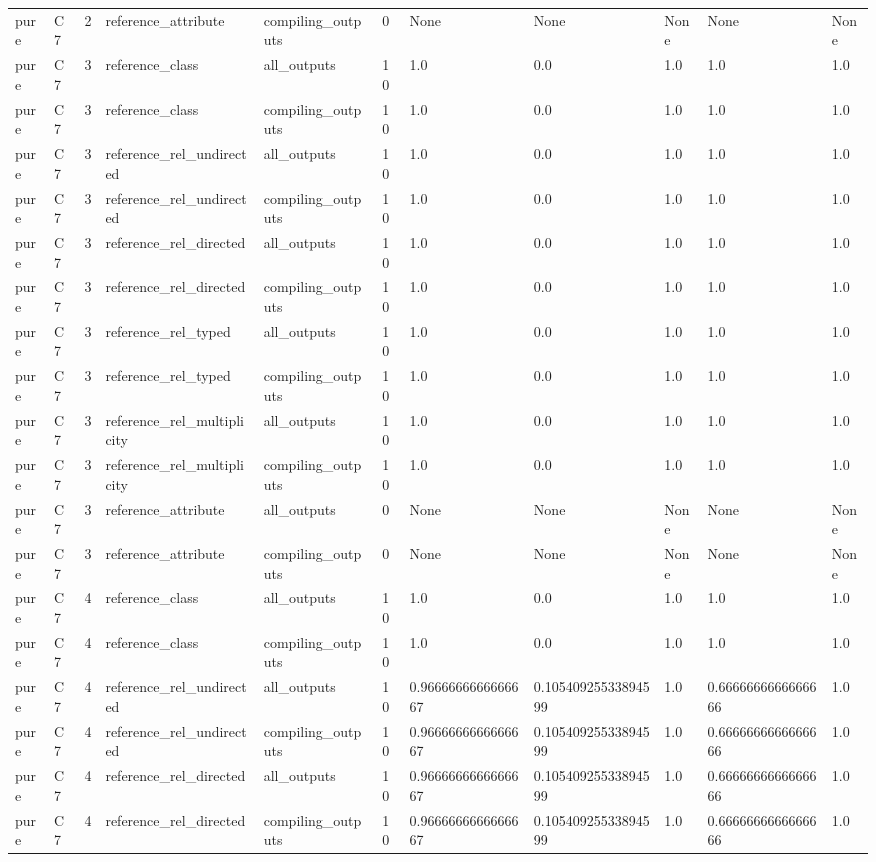 \begin{tabular}{lllllllllll}
pure & C7 & 2 & reference\_attribute & compiling\_outputs & 0 & None & None & None & None & None \\
pure & C7 & 3 & reference\_class & all\_outputs & 10 & 1.0 & 0.0 & 1.0 & 1.0 & 1.0 \\
pure & C7 & 3 & reference\_class & compiling\_outputs & 10 & 1.0 & 0.0 & 1.0 & 1.0 & 1.0 \\
pure & C7 & 3 & reference\_rel\_undirected & all\_outputs & 10 & 1.0 & 0.0 & 1.0 & 1.0 & 1.0 \\
pure & C7 & 3 & reference\_rel\_undirected & compiling\_outputs & 10 & 1.0 & 0.0 & 1.0 & 1.0 & 1.0 \\
pure & C7 & 3 & reference\_rel\_directed & all\_outputs & 10 & 1.0 & 0.0 & 1.0 & 1.0 & 1.0 \\
pure & C7 & 3 & reference\_rel\_directed & compiling\_outputs & 10 & 1.0 & 0.0 & 1.0 & 1.0 & 1.0 \\
pure & C7 & 3 & reference\_rel\_typed & all\_outputs & 10 & 1.0 & 0.0 & 1.0 & 1.0 & 1.0 \\
pure & C7 & 3 & reference\_rel\_typed & compiling\_outputs & 10 & 1.0 & 0.0 & 1.0 & 1.0 & 1.0 \\
pure & C7 & 3 & reference\_rel\_multiplicity & all\_outputs & 10 & 1.0 & 0.0 & 1.0 & 1.0 & 1.0 \\
pure & C7 & 3 & reference\_rel\_multiplicity & compiling\_outputs & 10 & 1.0 & 0.0 & 1.0 & 1.0 & 1.0 \\
pure & C7 & 3 & reference\_attribute & all\_outputs & 0 & None & None & None & None & None \\
pure & C7 & 3 & reference\_attribute & compiling\_outputs & 0 & None & None & None & None & None \\
pure & C7 & 4 & reference\_class & all\_outputs & 10 & 1.0 & 0.0 & 1.0 & 1.0 & 1.0 \\
pure & C7 & 4 & reference\_class & compiling\_outputs & 10 & 1.0 & 0.0 & 1.0 & 1.0 & 1.0 \\
pure & C7 & 4 & reference\_rel\_undirected & all\_outputs & 10 & 0.9666666666666667 & 0.10540925533894599 & 1.0 & 0.6666666666666666 & 1.0 \\
pure & C7 & 4 & reference\_rel\_undirected & compiling\_outputs & 10 & 0.9666666666666667 & 0.10540925533894599 & 1.0 & 0.6666666666666666 & 1.0 \\
pure & C7 & 4 & reference\_rel\_directed & all\_outputs & 10 & 0.9666666666666667 & 0.10540925533894599 & 1.0 & 0.6666666666666666 & 1.0 \\
pure & C7 & 4 & reference\_rel\_directed & compiling\_outputs & 10 & 0.9666666666666667 & 0.10540925533894599 & 1.0 & 0.6666666666666666 & 1.0 \\

\end{tabular}
